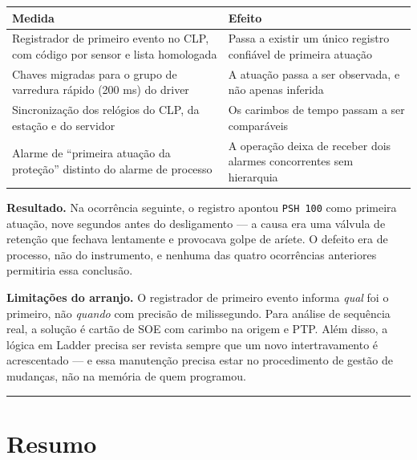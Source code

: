 \begin{longtable}[]{@{}
  >{\raggedright\arraybackslash}p{}
  >{\raggedright\arraybackslash}p{}@{}}
\toprule\noalign{}
\begin{minipage}[b]{\linewidth}\raggedright
Medida
\end{minipage} & \begin{minipage}[b]{\linewidth}\raggedright
Efeito
\end{minipage} \\
\midrule\noalign{}
\endhead
\bottomrule\noalign{}
\endlastfoot
Registrador de primeiro evento no CLP, com código por sensor e lista homologada & Passa a existir um único registro confiável de primeira atuação \\
Chaves migradas para o grupo de varredura rápido (200 ms) do driver & A atuação passa a ser observada, e não apenas inferida \\
Sincronização dos relógios do CLP, da estação e do servidor & Os carimbos de tempo passam a ser comparáveis \\
Alarme de ``primeira atuação da proteção'' distinto do alarme de processo & A operação deixa de receber dois alarmes concorrentes sem hierarquia \\
\end{longtable}

\textbf{Resultado.} Na ocorrência seguinte, o registro apontou \passthrough{\lstinline!PSH 100!} como primeira atuação, nove
segundos antes do desligamento --- a causa era uma válvula de retenção que fechava lentamente e
provocava golpe de aríete. O defeito era de processo, não do instrumento, e nenhuma das quatro
ocorrências anteriores permitiria essa conclusão.

\textbf{Limitações do arranjo.} O registrador de primeiro evento informa \emph{qual} foi o primeiro, não
\emph{quando} com precisão de milissegundo. Para análise de sequência real, a solução é cartão de SOE com
carimbo na origem e PTP. Além disso, a lógica em Ladder precisa ser revista sempre que um novo
intertravamento é acrescentado --- e essa manutenção precisa estar no procedimento de gestão de
mudanças, não na memória de quem programou.

\begin{center}\rule{0.5\linewidth}{0.5pt}\end{center}

\section{Resumo}\label{resumo}

